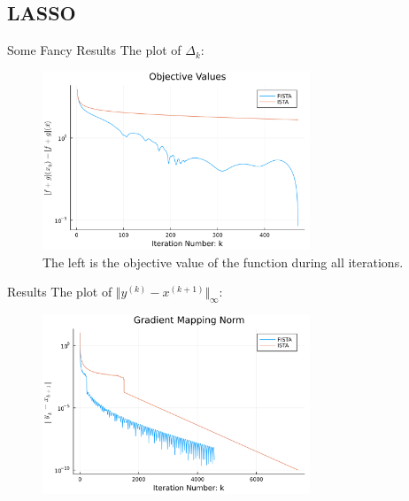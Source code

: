 \subsection{LASSO}
\begin{frame}{Some Fancy Results}
    The plot of $\Delta_k$: 
    \begin{figure}[h]
        \centering
        \includegraphics[width=8cm]{Assets/simple_lass_obj.png}
        \caption{The left is the objective value of the function during all iterations.}
    \end{figure}
\end{frame}

\begin{frame}{Results}
    The plot of $\Vert y^{(k)} - x^{(k + 1)}\Vert_\infty$:
    \begin{figure}[h]
        \centering
        \includegraphics[width=8cm]{Assets/simple_lass_pgrad.png}
    \end{figure}
\end{frame}


